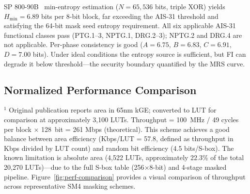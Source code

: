 \documentclass[journal]{IEEEtran}
\begin{document}
SP 800-90B~\cite{nist2018sp80090B} min-entropy estimation ($N=65{,}536$ bits, triple XOR) yields $H_{\text{min}}=6.89$ bits per 8-bit block, far exceeding the AIS-31 threshold and satisfying the 64-bit mask seed entropy requirement. All six applicable AIS-31 functional classes pass (PTG.1--3, NPTG.1, DRG.2--3); NPTG.2 and DRG.4 are not applicable. Per-phase consistency is good ($A=6.75$, $B=6.83$, $C=6.91$, $D=7.00$ bits). Under ideal conditions the entropy source is sufficient, but FI can degrade it below threshold---the security boundary quantified by the MRS curve.

\subsection{Normalized Performance Comparison}

\begin{table}[t]
\renewcommand{\arraystretch}{1.1}
\caption{Normalized Performance Comparison with State-of-the-Art}
\label{tab:perf-comparison}
\end{table}
$^1$ Original publication reports area in 65nm kGE; converted to LUT for comparison at approximately 3,100 LUTs. Throughput = 100~MHz / 49 cycles per block $\times$ 128~bit = 261 Mbps (theoretical).
This scheme achieves a good balance between area efficiency (Kbps/LUT = 57.8, defined as throughput in Kbps divided by LUT count) and random bit efficiency (4.5 bits/S-box). The known limitation is absolute area (4,522 LUTs, approximately 22.3\% of the total 20,270 LUTs)---due to the full S-box table (256$\times$8-bit) and 4-stage masked pipeline. Figure~\ref{fig:perf-comparison} provides a visual comparison of throughput across representative SM4 masking schemes.
\end{document}
